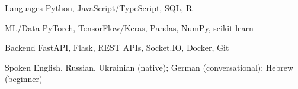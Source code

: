 

\begin{cvskills}

  \cvskill
    {Languages} %
    {Python, JavaScript/TypeScript, SQL, R} %

  \cvskill
    {ML/Data} %
    {PyTorch, TensorFlow/Keras, Pandas, NumPy, scikit-learn} %

  \cvskill
    {Backend} %
    {FastAPI, Flask, REST APIs, Socket.IO, Docker, Git} %

  \cvskill
    {Spoken} %
    {English, Russian, Ukrainian (native); German (conversational); Hebrew (beginner)} %

\end{cvskills}
